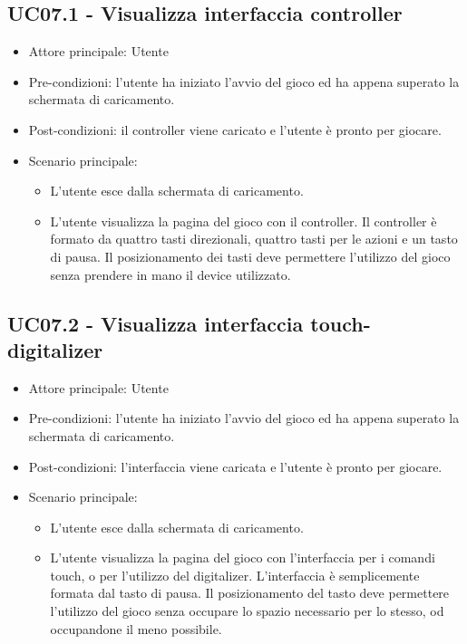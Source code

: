 \subsection{UC07.1 - Visualizza interfaccia controller}
\begin{itemize}
    \item Attore principale: Utente
    \item Pre-condizioni: l'utente ha iniziato l'avvio del gioco ed ha appena superato la schermata di caricamento.
    \item Post-condizioni: il controller viene caricato e l'utente è pronto per giocare.
    \item Scenario principale: \begin{itemize}
        \item L'utente esce dalla schermata di caricamento.
        \item L'utente visualizza la pagina del gioco con il controller. Il controller è formato da quattro tasti direzionali, quattro tasti per le azioni e un tasto di pausa. Il posizionamento dei tasti deve permettere l'utilizzo del gioco senza prendere in mano il device utilizzato.
    \end{itemize}
\end{itemize}

\subsection{UC07.2 - Visualizza interfaccia touch-digitalizer}
\begin{itemize}
    \item Attore principale: Utente
    \item Pre-condizioni: l'utente ha iniziato l'avvio del gioco ed ha appena superato la schermata di caricamento.
    \item Post-condizioni: l'interfaccia viene caricata e l'utente è pronto per giocare.
    \item Scenario principale: \begin{itemize}
        \item L'utente esce dalla schermata di caricamento.
        \item L'utente visualizza la pagina del gioco con l'interfaccia per i comandi touch, o per l'utilizzo del digitalizer. L'interfaccia è semplicemente formata dal tasto di pausa. Il posizionamento del tasto deve permettere l'utilizzo del gioco senza occupare lo spazio necessario per lo stesso, od occupandone il meno possibile.
    \end{itemize}
\end{itemize}
\newpage
